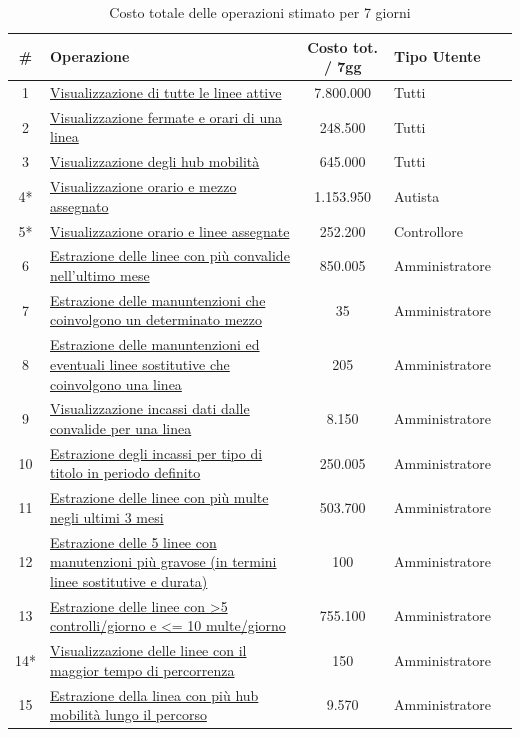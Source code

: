 \documentclass[12pt,a4paper]{report}
\begin{document}
\begin{longtable}{|c|p{8cm}|c|l|l|}
\caption{Costo totale delle operazioni stimato per 7 giorni}
\label{table:operazioni_tot}\\
\hline
\textbf{\#} & \textbf{Operazione} & \textbf{Costo tot. / 7gg} & \textbf{Tipo Utente} \\
\hline
\endhead
1  & \hyperref[op1]{Visualizzazione di tutte le linee attive} & 7.800.000 & Tutti \\
\hline
2 & \hyperref[op2]{Visualizzazione fermate e orari di una linea} & 248.500 & Tutti \\
\hline
3 & \hyperref[op3]{Visualizzazione degli hub mobilità} & 645.000 & Tutti \\
\hline
4* & \hyperref[op4]{Visualizzazione orario e mezzo assegnato} & 1.153.950 & Autista \\
\hline
5* & \hyperref[op5]{Visualizzazione orario e linee assegnate} & 252.200 & Controllore \\
\hline
6 & \hyperref[op6]{Estrazione delle linee con più convalide nell'ultimo mese} & 850.005 & Amministratore  \\
\hline
7 & \hyperref[op7]{Estrazione delle manuntenzioni che coinvolgono un determinato mezzo} & 35 & Amministratore \\
\hline
8 & \hyperref[op8]{Estrazione delle manuntenzioni ed eventuali linee sostitutive che coinvolgono una linea} & 205 & Amministratore \\
\hline
9 & \hyperref[op9]{Visualizzazione incassi dati dalle convalide per una linea} & 8.150 & Amministratore \\
\hline
10 & \hyperref[op10]{Estrazione degli incassi per tipo di titolo in periodo definito} & 250.005 & Amministratore \\
\hline
11 & \hyperref[op11]{Estrazione delle linee con più multe negli ultimi 3 mesi} & 503.700 & Amministratore \\
\hline
12 & \hyperref[op12]{Estrazione delle 5 linee con manutenzioni più gravose (in termini linee sostitutive e durata)} & 100 & Amministratore  \\
\hline
13 & \hyperref[op13]{Estrazione delle linee con \textgreater 5 controlli/giorno e \textless = 10 multe/giorno} & 755.100 & Amministratore  \\
\hline
14* & \hyperref[op14]{Visualizzazione delle linee con il maggior tempo di percorrenza} & 150 & Amministratore  \\
\hline
15 & \hyperref[op15]{Estrazione della linea con più hub mobilità lungo il percorso} & 9.570 & Amministratore \\

\end{longtable}
\end{document}
